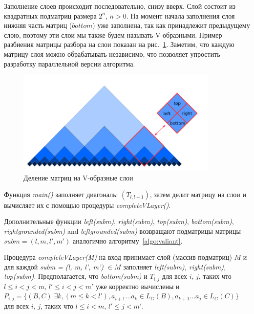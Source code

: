 \documentclass[14pt]{matmex-diploma-custom}
\begin{document}
Заполнение слоев происходит последовательно, снизу вверх. Слой состоит из квадратных подматриц размера $2^n$, $n > 0$. На момент начала заполнения слоя нижняя часть матриц ($bottom$) уже заполнена, так как принадлежит предыдущему слою, поэтому эти слои мы также будем называть V-образными. Пример разбиения матрицы разбора на слои показан на рис.~\ref{fig2}. Заметим, что каждую матрицу слоя можно обрабатывать независимо, что позволяет упростить разработку параллельной версии алгоритма. 

\begin{figure}
\vspace{3mm}
 \begin{center}
    \centering
    \includegraphics[width=10cm]{layers.png}
    \caption{Деление матриц на V-образные слои}
    \label{fig2}
 \end{center}
\vspace{-8mm}
\end{figure}

Функция \textit{main()} заполняет диагональ:  $(T_{l, l+1})$, затем делит матрицу на слои и вычисляет их с помощью процедуры \textit{completeVLayer()}.

Дополнительные функции \textit{left(subm)}, \textit{right(subm)}, \textit{top(subm)}, \textit{bottom(subm)}, \textit{rightgrounded(subm)} and \textit{leftgrounded(subm)} возвращают подматрицы матрицы $\textit{subm} = (l, m, l', m')$ аналогично алгоритму~\ref{algo:valiant}.

Процедура \textit{completeVLayer(M)} на вход принимает слой (массив подматриц)  $M$ и для каждой \textit{subm = (l, m, l', m') $\in M$} заполняет \textit{left(subm), right(subm), top(subm)}.
Предполагается, что \textit{bottom(subm)} и $T_{i, j}$ для всех $i$, $j$, таких что $l \leq i < j < m$, $  l' \leq i < j < m'$ уже корректно вычислены и 
$P_{i, j} =  \{ (B, C) | \exists k, (m \le k < l'), a_{i + 1} \dots a_{k} \in L_G(B), a_{k + 1} \dots a_{j} \in L_G(C)\} $ для всех $i$, $j$, таких что $l \leq i < m$, $l' \leq j < m'$.
\end{document}
